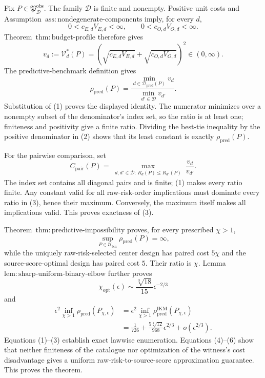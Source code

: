 Fix \(P\in\mathfrak P_{\mathcal D}^{\mathrm{obs}}\). The family \(\mathcal D\) is finite and nonempty. Positive unit costs and Assumption~\(\mathrm{ass{:}nondegenerate\text{-}components}\) imply, for every \(d\),
\[
 0<c_{E,d}V_{E,d}<\infty,
 \qquad 0<c_{O,d}V_{O,d}<\infty.
\]
Theorem~\(\mathrm{thm{:}budget\text{-}profile}\) therefore gives
\[
 v_d:=\mathcal V_d^*(P)
 =(\sqrt{c_{E,d}V_{E,d}}+\sqrt{c_{O,d}V_{O,d}})^2\in(0,\infty). \tag{1}
\]
The predictive-benchmark definition gives
\[
 \rho_{\mathrm{pred}}(P)
 =\frac{\min_{d\in\mathcal D_{\mathrm{pred}}(P)}v_d}
 {\min_{d'\in\mathcal D}v_{d'}}. \tag{2}
\]
Substitution of (1) proves the displayed identity. The numerator minimizes over a nonempty subset of the denominator's index set, so the ratio is at least one; finiteness and positivity give a finite ratio. Dividing the best-tie inequality by the positive denominator in (2) shows that its least constant is exactly \(\rho_{\mathrm{pred}}(P)\).

For the pairwise comparison, set
\[
 C_{\mathrm{pair}}(P)
 =\max_{\substack{d,d'\in\mathcal D:\,R_d(P)\le R_{d'}(P)}}
 \frac{v_d}{v_{d'}}. \tag{3}
\]
The index set contains all diagonal pairs and is finite; (1) makes every ratio finite. Any constant valid for all raw-risk-order implications must dominate every ratio in (3), hence their maximum. Conversely, the maximum itself makes all implications valid. This proves exactness of (3).

Theorem~\(\mathrm{thm{:}predictive\text{-}impossibility}\) proves, for every prescribed \(\chi>1\),
\[
 \sup_{P\in\mathcal U_{\mathrm{bin}}}\rho_{\mathrm{pred}}(P)=\infty, \tag{4}
\]
while the uniquely raw-risk-selected center design has paired cost \(5\chi\) and the source-score-optimal design has paired cost \(5\). Their ratio is \(\chi\). Lemma~\(\mathrm{lem{:}sharp\text{-}uniform\text{-}binary\text{-}elbow}\) further proves
\[
 \chi_{\mathrm{opt}}(\epsilon)
 \sim\frac{\sqrt[3]{18}}{15}\epsilon^{-2/3} \tag{5}
\]
and
\[
\begin{aligned}
 \epsilon^2\inf_{\chi>1}\rho_{\mathrm{pred}}(P_{\chi,\epsilon})
 &=\epsilon^2\inf_{\chi>1}\rho_{\mathrm{pred}}^{\mathrm{IKM}}(P_{\chi,\epsilon})\\
 &=\frac1{726}+\frac{5\sqrt[3]{12}}{968}\epsilon^{2/3}+o(\epsilon^{2/3}). \tag{6}
\end{aligned}
\]
Equations (1)--(3) establish exact lawwise enumeration. Equations (4)--(6) show that neither finiteness of the catalogue nor optimization of the witness's cost disadvantage gives a uniform raw-risk-to-source-score approximation guarantee. This proves the theorem.
